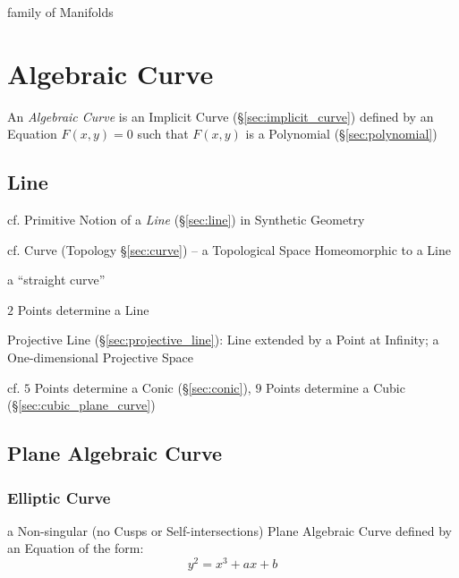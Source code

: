 \begin{itemize}
family of Manifolds



\section{Algebraic Curve}\label{sec:algebraic_curve}

An \emph{Algebraic Curve} is an Implicit Curve (\S\ref{sec:implicit_curve})
defined by an Equation $F(x,y) = 0$ such that $F(x,y)$ is a Polynomial
(\S\ref{sec:polynomial})



\subsection{Line}\label{sec:algebraic_line}

\fist cf. Primitive Notion of a \emph{Line} (\S\ref{sec:line}) in Synthetic
Geometry

\fist cf. Curve (Topology \S\ref{sec:curve}) -- a Topological Space Homeomorphic
to a Line

a ``straight curve''

$2$ Points determine a Line

\fist Projective Line (\S\ref{sec:projective_line}): Line extended by a Point at
Infinity; a One-dimensional Projective Space

cf. $5$ Points determine a Conic (\S\ref{sec:conic}), $9$ Points determine a
Cubic (\S\ref{sec:cubic_plane_curve})



\subsection{Plane Algebraic Curve}\label{sec:plane_algebraic_curve}

\subsubsection{Elliptic Curve}\label{sec:elliptic_curve}

a Non-singular (no Cusps or Self-intersections) Plane Algebraic Curve defined
by an Equation of the form:
\[
  y^2 = x^3 + ax + b
\]


\end{itemize}
